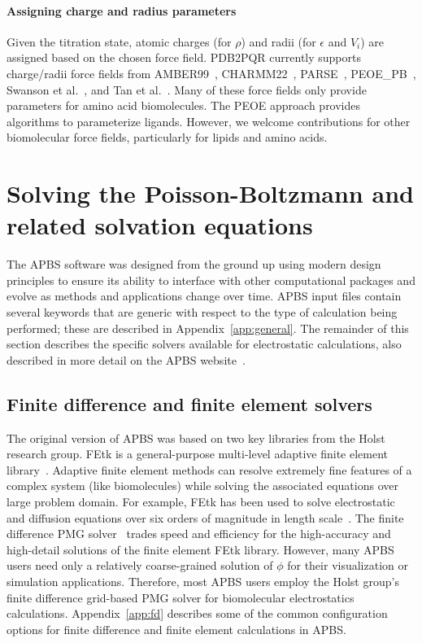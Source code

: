 \documentclass[12pt,titlepage]{article}
\newcommand{\revision}[1]{#1}
\begin{document}
\paragraph{Assigning charge and radius parameters} 
Given the tit\-rat\-ion state, atomic charges (for $\rho$) and radii (for $\epsilon$ and $V_i$) are assigned based on the chosen force field.
PDB2PQR currently supports charge/radii force fields from AMBER99~\cite{AMBER99}, CHARMM22~\cite{MacKerell2004}, PARSE~\cite{Sitkoff1994}, PEOE\_PB~\cite{Czodrowski2006}, Swanson et al.~\cite{Swanson2005a}, and Tan et al.~\cite{Tan2006}.
\revision{Many of these force fields only provide parameters for amino acid biomolecules. 
The PEOE approach \cite{Czodrowski2006} provides algorithms to parameterize ligands.
However, we welcome contributions for other biomolecular force fields, particularly for lipids and amino acids.}

\section{Solving the Poisson-Boltzmann and related solvation equations} \label{sec:apbs}
The APBS software was designed from the ground up using modern design principles to ensure its ability to interface with other computational packages and evolve as methods and applications change over time.
APBS input files contain several keywords that are generic with respect to the type of calculation being performed; these are described in Appendix~\ref{app:general}.
The remainder of this section describes the specific solvers available for electrostatic calculations, also described in more detail on the APBS website~\cite{APBSweb}.

\subsection{Finite difference and finite element solvers} \label{sec:fd}
The original version of APBS was based on two key libraries from the Holst research group.
FEtk is a general-purpose multi-level adaptive finite element library~\cite{FEtk, FEtkweb}.
Adaptive finite element methods can resolve extremely fine features of a complex system (like biomolecules) while solving the associated equations over large problem domain.
For example, FEtk has been used to solve electrostatic and diffusion equations over six orders of magnitude in length scale~\cite{Tai2003}.
The finite difference PMG solver~\cite{FEtkweb, Holst1993} trades speed and efficiency for the high-accuracy and high-detail solutions of the finite element FEtk library.
However, many APBS users need only a relatively coarse-grained solution of $\phi$ for their visualization or simulation applications.
Therefore, most APBS users employ the Holst group's finite difference grid-based PMG solver for biomolecular electrostatics calculations.
Appendix~\ref{app:fd} describes some of the common configuration options for finite difference and finite element calculations in APBS.
\end{document}
